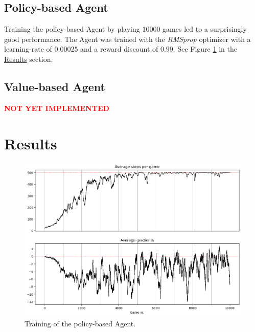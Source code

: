 \documentclass{article}
\renewenvironment{leftbar}[1][\hsize]{
    \def\FrameCommand{{\color{barcolor}\vrule width 0.5pt \hspace{10pt}}}
    \MakeFramed{\hsize#1 \advance\hsize-\width \FrameRestore}
}{\endMakeFramed}
\begin{document}
\subsection*{Policy-based Agent}
\begin{leftbar}
    Training the policy-based Agent by playing $10 000$ games led to a surprisingly good performance. The Agent was trained with the \textit{RMSprop} optimizer with a learning-rate of $0.00025$ and a reward discount of $0.99$. See Figure \ref{fig:policy-based-metrics} in the \hyperlink{sec:results}{Results} section.
\end{leftbar}
\subsection*{Value-based Agent}
\begin{leftbar}
    \textbf{\textcolor{red}{NOT YET IMPLEMENTED}}
\end{leftbar}

\newpage
\hypertarget{sec:results}{}
\section*{Results}

\begin{figure}[h]
    \centering
    \includegraphics[width=15cm]{images/policy-based-metrics.png}
    \caption{Training of the policy-based Agent.}
    \label{fig:policy-based-metrics}
\end{figure}

\newpage
\printbibliography
\end{document}
